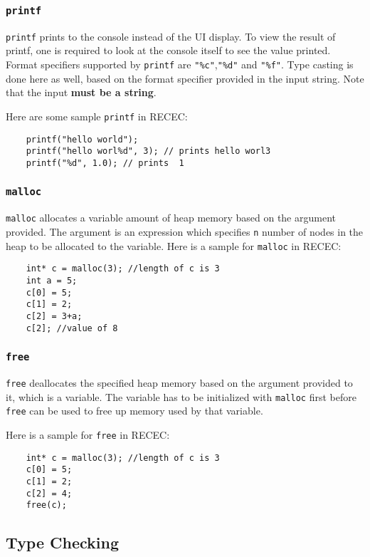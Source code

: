 \documentclass[a4paper]{article}
\begin{document}
\subsubsection{\texttt{printf}}

\texttt{printf} prints to the console instead of the UI display. To view the result of printf, one is required to look at the console itself to see the value printed. Format specifiers supported by \texttt{printf} are \texttt{"\%c"},\texttt{"\%d"} and \texttt{"\%f"}. Type casting is done here as well, based on the format specifier provided in the input string. Note that the input \textbf{must be a string}. 

Here are some sample \texttt{printf} in RECEC:
\begin{verbatim}
	printf("hello world");
	printf("hello worl%d", 3); // prints hello worl3
	printf("%d", 1.0); // prints  1
\end{verbatim}

\subsubsection{\texttt{malloc}}

\texttt{malloc} allocates a variable amount of heap memory based on the argument provided. The 
argument is an expression which specifies \texttt{n} number of nodes in the heap to be allocated to the variable. 
Here is a sample for \texttt{malloc} in RECEC:
\begin{verbatim}
	int* c = malloc(3); //length of c is 3
    int a = 5;
    c[0] = 5;
    c[1] = 2;
    c[2] = 3+a;
    c[2]; //value of 8
\end{verbatim}

\subsubsection{\texttt{free}}

\texttt{free} deallocates the specified heap memory based on the argument provided to it, which is a variable. The variable has to be initialized with \texttt{malloc} first before \texttt{free} can be used to free up memory used by that variable.

Here is a sample for \texttt{free} in RECEC:
\begin{verbatim}
	int* c = malloc(3); //length of c is 3
    c[0] = 5;
    c[1] = 2;
    c[2] = 4;
    free(c);
\end{verbatim}

\subsection{Type Checking}
\end{document}
